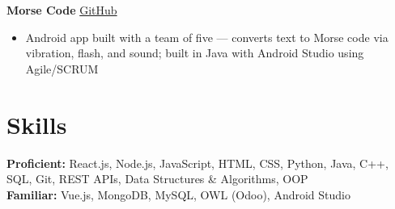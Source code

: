 \documentclass[letterpaper,10.5pt]{article}
\newcommand{\resumeItem}[1]{\item\small{#1}}
\begin{document}
\vspace{3pt}
\textbf{Morse Code} \hfill \href{https://github.com/MrPintoo/MorseCode}{GitHub}
\begin{itemize}[leftmargin=0.15in, topsep=2pt, itemsep=0pt, parsep=0pt]
  \resumeItem{Android app built with a team of five — converts text to Morse code via vibration, flash, and sound; built in Java with Android Studio using Agile/SCRUM}
\end{itemize}

\section{Skills}
\textbf{Proficient:} React.js, Node.js, JavaScript, HTML, CSS, Python, Java, C++, SQL, Git, REST APIs, Data Structures \& Algorithms, OOP \\
\textbf{Familiar:} Vue.js, MongoDB, MySQL, OWL (Odoo), Android Studio
\end{document}
